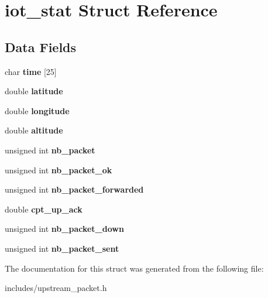 \hypertarget{structiot__stat}{\section{iot\-\_\-stat Struct Reference}
\label{structiot__stat}
}
\subsection*{Data Fields}
\begin{DoxyCompactItemize}
\item 
\hypertarget{structiot__stat_a310ce9cb0b22e4acd7fce6addf69d054}{char {\bfseries time} \mbox{[}25\mbox{]}}\label{structiot__stat_a310ce9cb0b22e4acd7fce6addf69d054}

\item 
\hypertarget{structiot__stat_a76714bdbc5c536fa77dfb14533ff82a9}{double {\bfseries latitude}}\label{structiot__stat_a76714bdbc5c536fa77dfb14533ff82a9}

\item 
\hypertarget{structiot__stat_ac155e35fdeebafc89723a51520fb9fe6}{double {\bfseries longitude}}\label{structiot__stat_ac155e35fdeebafc89723a51520fb9fe6}

\item 
\hypertarget{structiot__stat_a2b13d276aee0d9fd646c8fa3647e869b}{double {\bfseries altitude}}\label{structiot__stat_a2b13d276aee0d9fd646c8fa3647e869b}

\item 
\hypertarget{structiot__stat_afa71eb784e6b9b1f01258d26e1e03721}{unsigned int {\bfseries nb\-\_\-packet}}\label{structiot__stat_afa71eb784e6b9b1f01258d26e1e03721}

\item 
\hypertarget{structiot__stat_a6c0f4ca3d140d8a6c68118ab7cdcf45d}{unsigned int {\bfseries nb\-\_\-packet\-\_\-ok}}\label{structiot__stat_a6c0f4ca3d140d8a6c68118ab7cdcf45d}

\item 
\hypertarget{structiot__stat_a35ba5829896d7c7f3778db04c2dd5fd2}{unsigned int {\bfseries nb\-\_\-packet\-\_\-forwarded}}\label{structiot__stat_a35ba5829896d7c7f3778db04c2dd5fd2}

\item 
\hypertarget{structiot__stat_a5887954163ae70e1d604350a6293cb8e}{double {\bfseries cpt\-\_\-up\-\_\-ack}}\label{structiot__stat_a5887954163ae70e1d604350a6293cb8e}

\item 
\hypertarget{structiot__stat_abab9eaf7c3099350c7913d368534eb12}{unsigned int {\bfseries nb\-\_\-packet\-\_\-down}}\label{structiot__stat_abab9eaf7c3099350c7913d368534eb12}

\item 
\hypertarget{structiot__stat_a160a7b2e1d190579a5b5d9b9829d403f}{unsigned int {\bfseries nb\-\_\-packet\-\_\-sent}}\label{structiot__stat_a160a7b2e1d190579a5b5d9b9829d403f}

\end{DoxyCompactItemize}


The documentation for this struct was generated from the following file\-:\begin{DoxyCompactItemize}
\item 
includes/upstream\-\_\-packet.\-h\end{DoxyCompactItemize}
